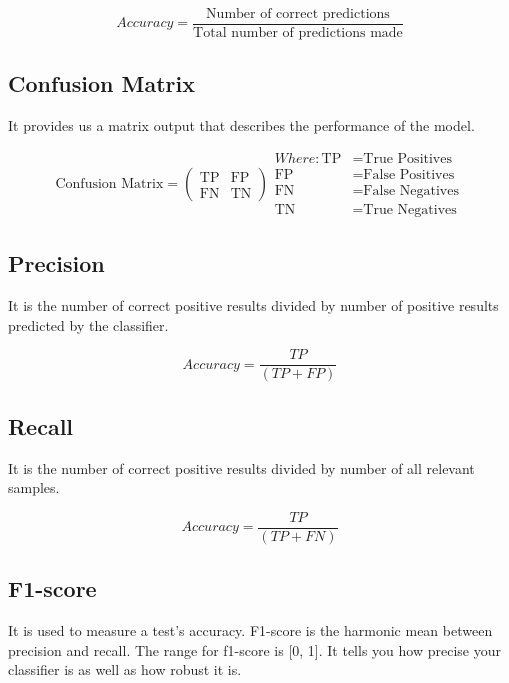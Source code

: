\begin{equation}
\label{eq:accuracy_formula} 
Accuracy = \frac{\text{Number of correct predictions}}{\text{Total number of predictions made}}
\end{equation}

\subsection{Confusion Matrix}
It provides us a matrix output that describes the performance of the model. 

\begin{equation}
\label{eq:confusion_matrix}
\text{Confusion Matrix} = \begin{pmatrix}
\text{TP} & \text{FP} \\
\text{FN} & \text{TN}
\end{pmatrix}
\begin{aligned}
Where:
\text{TP} & = \text{True Positives} \\
\text{FP} & = \text{False Positives} \\
\text{FN} & = \text{False Negatives} \\
\text{TN} & = \text{True Negatives}
\end{aligned}
\end{equation}

\subsection{Precision}
It is the number of correct positive results divided by number of positive results predicted by the classifier. 

\begin{equation}
\label{eq:precision} 
Accuracy = \frac{TP}{(TP+FP)}
\end{equation}

\subsection{Recall}
It is the number of correct positive results divided by number of all relevant samples. 

\begin{equation}
\label{eq:recall} 
Accuracy = \frac{TP}{(TP+FN)}
\end{equation}

\subsection{F1-score}
It is used to measure a test’s accuracy. F1-score is the harmonic mean between precision and recall. The range for  f1-score is [0, 1]. It tells you how precise your classifier is as well as how robust it is.

